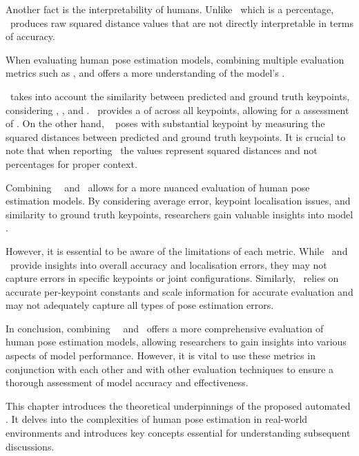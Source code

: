 Another fact is the interpretability of humans. Unlike \APE\, which is a percentage, \MSE\ produces raw squared distance values that are not directly interpretable in terms of accuracy.


When evaluating human pose estimation models, combining multiple evaluation metrics such as \pojem{\OKS}, \pojem{\APE} and \pojem{\MSE} offers a more  understanding of the model's .

\OKS\ takes into account the similarity between predicted and ground truth keypoints, considering , , and . \APE\ provides a  of  across all keypoints, allowing for a  assessment of . On the other hand, \MSE\  poses with substantial keypoint  by measuring the squared distances between predicted and ground truth keypoints. It is crucial to note that when reporting \MSE\, the values represent squared distances and not percentages for proper context.

Combining \OKS\, \APE\ and \MSE\ allows for a more nuanced evaluation of hu\-man pose estimation models. By considering average error, keypoint localisation issues, and similarity to ground truth keypoints, researchers gain valuable insights into model .

However, it is essential to be aware of the limitations of each metric. While \APE\ and \MSE\ provide insights into overall accuracy and localisation errors, they may not capture errors in specific keypoints or joint configurations. Similarly, \OKS\ relies on accurate per-keypoint constants and scale information for accurate evaluation and may not adequately capture all types of pose estimation errors.

In conclusion, combining \OKS\, \APE\ and \MSE\ offers a more comprehensive evaluation of human pose estimation models, allowing researchers to gain in\-sights into various aspects of model performance. However, it is vital to use these metrics in conjunction with each other and with other evaluation techniques to ensure a thorough assessment of model accuracy and effectiveness.

This chapter introduces the theoretical underpinnings of the proposed automated . It delves into the complexities of human pose estimation in real-world environments and introduces key concepts essential for understanding subsequent discussions.

